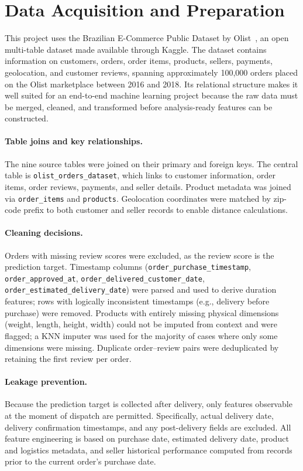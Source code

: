 \documentclass[11pt]{article}
\begin{document}
\section{Data Acquisition and Preparation}

This project uses the Brazilian E-Commerce Public Dataset by Olist~\cite{dataset}, an open multi-table dataset made available through Kaggle. The dataset contains information on customers, orders, order items, products, sellers, payments, geolocation, and customer reviews, spanning approximately 100{,}000 orders placed on the Olist marketplace between 2016 and 2018. Its relational structure makes it well suited for an end-to-end machine learning project because the raw data must be merged, cleaned, and transformed before analysis-ready features can be constructed.

\paragraph{Table joins and key relationships.}
The nine source tables were joined on their primary and foreign keys. The central table is \texttt{olist\_orders\_dataset}, which links to customer information, order items, order reviews, payments, and seller details. Product metadata was joined via \texttt{order\_items} and \texttt{products}. Geolocation coordinates were matched by zip-code prefix to both customer and seller records to enable distance calculations.

\paragraph{Cleaning decisions.}
Orders with missing review scores were excluded, as the review score is the prediction target. Timestamp columns (\texttt{order\_purchase\_timestamp}, \texttt{order\_approved\_at}, \texttt{order\_delivered\_customer\_date}, \texttt{order\_estimated\_delivery\_date}) were parsed and used to derive duration features; rows with logically inconsistent timestamps (e.g., delivery before purchase) were removed. Products with entirely missing physical dimensions (weight, length, height, width) could not be imputed from context and were flagged; a KNN imputer was used for the majority of cases where only some dimensions were missing. Duplicate order--review pairs were deduplicated by retaining the first review per order.

\paragraph{Leakage prevention.}
Because the prediction target is collected after delivery, only features observable at the moment of dispatch are permitted. Specifically, actual delivery date, delivery confirmation timestamps, and any post-delivery fields are excluded. All feature engineering is based on purchase date, estimated delivery date, product and logistics metadata, and seller historical performance computed from records prior to the current order's purchase date.
\end{document}
